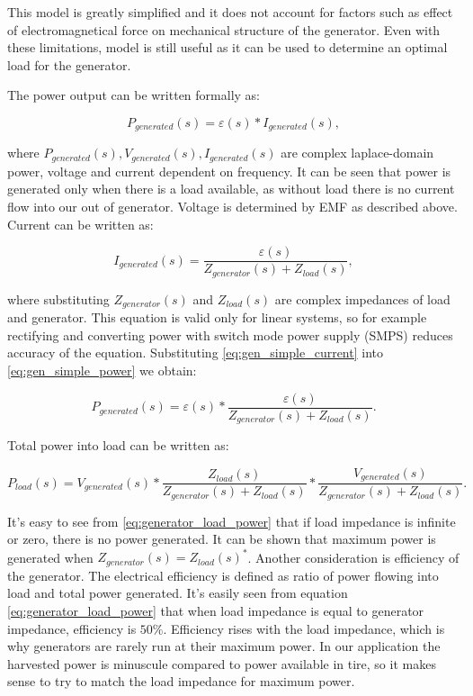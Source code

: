 This model is greatly simplified and it does not account for factors such as effect of electromagnetical force on mechanical structure of the generator. Even with these limitations, model is still useful as it can be used to determine an optimal load for the generator. 

The power output can be written formally as:

\begin{equation} \label{eq:gen_simple_power}
  P_{generated}(s) = \varepsilon(s)*I_{generated}(s),
\end{equation}

where $P_{generated}(s), V_{generated}(s), I_{generated}(s)$ are complex laplace-domain power, voltage and current dependent on frequency. It can be seen that power is generated only when there is a load available, as without load there is no current flow into our out of generator. Voltage is determined by EMF as described above. Current can be written as: 

\begin{equation} \label{eq:gen_simple_current}
  I_{generated}(s) = \frac{\varepsilon(s)}{Z_{generator}(s)+Z_{load}(s)},
\end{equation}

where substituting $Z_{generator}(s) $ and $ Z_{load}(s)$ are complex impedances of load and generator. This equation is valid only for linear systems, so for example rectifying and converting power with switch mode power supply (SMPS) reduces accuracy of the equation. Substituting \eqref{eq:gen_simple_current} into \eqref{eq:gen_simple_power} we obtain:

\begin{equation}
  P_{generated}(s) = \varepsilon(s)*\frac{\varepsilon(s)}{Z_{generator}(s)+Z_{load}(s)}.
\end{equation}

Total power into load can be written as:

\begin{equation} \label{eq:generator_load_power}
  P_{load}(s) = V_{generated}(s)*\frac{Z_{load}(s)}{Z_{generator}(s)+Z_{load}(s)}*\frac{V_{generated}(s)}{Z_{generator}(s)+Z_{load}(s)}.
\end{equation}

It's easy to see from \eqref{eq:generator_load_power} that if load impedance is infinite or zero, there is no power generated. It can be shown that maximum power is generated when $Z_{generator}(s) = {Z_{load}(s)}^*$. Another consideration is efficiency of the generator. The electrical efficiency is defined as ratio of power flowing into load and total power generated. It's easily seen from equation \eqref{eq:generator_load_power} that when load impedance is equal to generator impedance, efficiency is $ 50 \%$. Efficiency rises with the load impedance, which is why generators are rarely run at their maximum power. In our application the harvested power is minuscule compared to power available in tire, so it makes sense to try to match the load impedance for maximum power.

